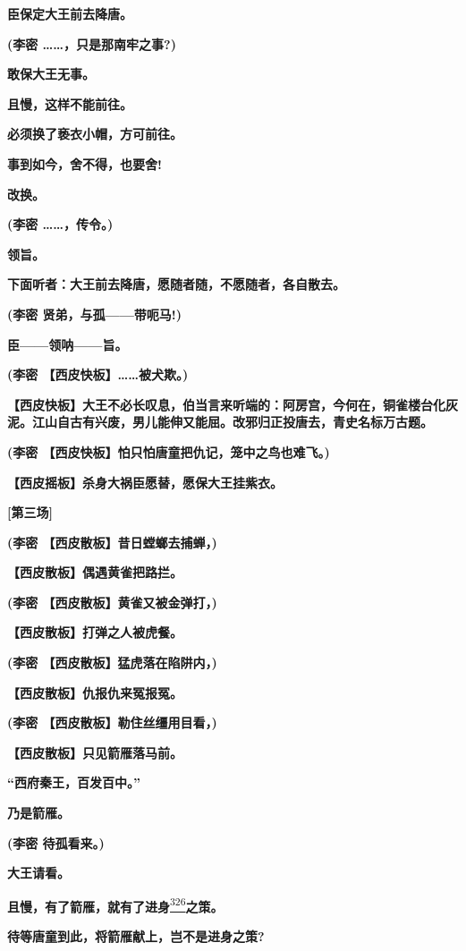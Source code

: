 \textbf{臣保定大王前去降唐。}

\textbf{(李密 \ldots{}\ldots{}，只是那南牢之事?)}

\textbf{敢保大王无事。}

\textbf{且慢，这样不能前往。}

\textbf{必须换了亵衣小帽，方可前往。}

\textbf{事到如今，舍不得，也要舍!}

\textbf{改换。}

\textbf{(李密 \ldots{}\ldots{}，传令。)}

\textbf{领旨。}

\textbf{下面听者：大王前去降唐，愿随者随，不愿随者，各自散去。}

\textbf{(李密 贤弟，与孤------带呃马!)}

\textbf{臣------领呐------旨。}

\textbf{(李密 【西皮快板】\ldots{}\ldots{}被犬欺。)}

\textbf{【西皮快板】大王不必长叹息，伯当言来听端的：阿房宫，今何在，铜雀楼台化灰泥。江山自古有兴废，男儿能伸又能屈。改邪归正投唐去，青史名标万古题。}

\textbf{(李密 【西皮快板】怕只怕唐童把仇记，笼中之鸟也难飞。)}

\textbf{【西皮摇板】杀身大祸臣愿替，愿保大王挂紫衣。}

\textbf{{[}第三场{]}}

\textbf{(李密 【西皮散板】昔日螳螂去捕蝉，)}

\textbf{【西皮散板】偶遇黄雀把路拦。}

\textbf{(李密 【西皮散板】黄雀又被金弹打，)}

\textbf{【西皮散板】打弹之人被虎餐。}

\textbf{(李密 【西皮散板】猛虎落在陷阱内，)}

\textbf{【西皮散板】仇报仇来冤报冤。}

\textbf{(李密 【西皮散板】勒住丝缰用目看，)}

\textbf{【西皮散板】只见箭雁落马前。}

\textbf{``西府秦王，百发百中。''}

\textbf{乃是箭雁。}

\textbf{(李密 待孤看来。)}

\textbf{大王请看。}

\textbf{且慢，有了箭雁，就有了进身}\protect\hyperlink{fn326}{\textsuperscript{326}}\textbf{之策。}

\textbf{待等唐童到此，将箭雁献上，岂不是进身之策?}

